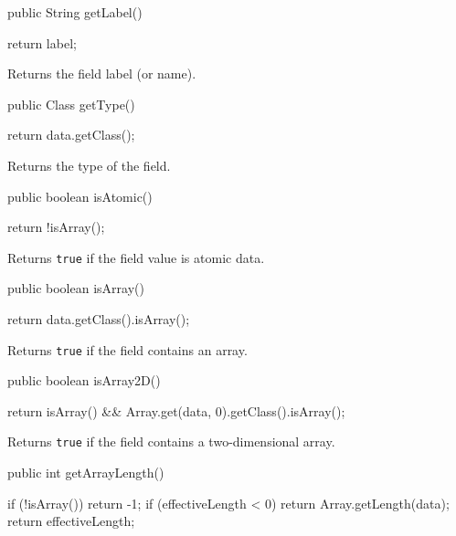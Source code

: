 \begin{code}
   public String getLabel() \begin{hide} {
      return label;
   }
   \end{hide}
\end{code}
\begin{tabb}
Returns the field label (or name).
\end{tabb}
\begin{code}

   public Class getType() \begin{hide} {
      return data.getClass();
   }
   \end{hide}
\end{code}
\begin{tabb}
Returns the type of the field.
\end{tabb}
\begin{code}
   
   public boolean isAtomic() \begin{hide} {
      return !isArray();
   }
   \end{hide}
\end{code}
\begin{tabb}
Returns \texttt{true} if the field value is atomic data.
\end{tabb}
\begin{code}
   
   public boolean isArray() \begin{hide} {
      return data.getClass().isArray();
   }
   \end{hide}
\end{code}
\begin{tabb}
Returns \texttt{true} if the field contains an array.
\end{tabb}
\begin{code}

   public boolean isArray2D() \begin{hide} {
      return isArray() && Array.get(data, 0).getClass().isArray();
   }
   \end{hide}
\end{code}
\begin{tabb}
Returns \texttt{true} if the field contains a two-dimensional array.
\end{tabb}
\begin{code}
   
   public int getArrayLength() \begin{hide} {
      if (!isArray()) return -1;
      if (effectiveLength < 0) return Array.getLength(data);
      return effectiveLength;
   }
   \end{hide}
\end{code}

